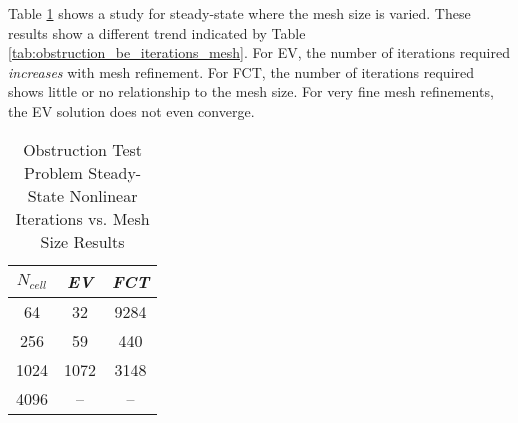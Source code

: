Table \ref{tab:obstruction_ss_iterations_mesh} shows a study for steady-state
where the mesh size is varied. These results show a different trend indicated
by Table \ref{tab:obstruction_be_iterations_mesh}.
For EV, the number of iterations required \emph{increases} with mesh refinement.
For FCT, the number of iterations required shows little or no relationship to
the mesh size. For very fine mesh refinements, the EV solution does not even
converge.

\begin{table}[htb]\caption{Obstruction Test Problem Steady-State
  Nonlinear Iterations vs. Mesh Size Results}
\label{tab:obstruction_ss_iterations_mesh}
\centering
\begin{tabular}{c c c}\toprule
$N_{cell}$ & \emph{EV} & \emph{FCT}\\\midrule
64         & 32 & 9284\\
256        & 59 & 440\\
1024       & 1072 & 3148\\
4096       & --   & --\\
\bottomrule\end{tabular}
\end{table}

\clearpage

